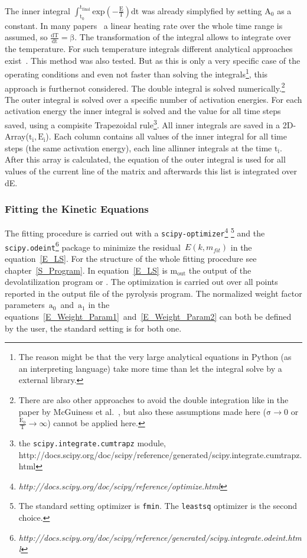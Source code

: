 The inner integral $\mathrm{\int^{t_{final}}_{t_0} exp\left( -\frac{E}{T} \right) dt}$ was already simplyfied by setting $\mathrm{A_0}$ as a constant. In many papers~\cite{Cai_DAEM1,Cai_DAEM2,Cai_DAEM3,Slovak_DAEM} a linear heating rate over the whole time range is assumed, so $\mathrm{\frac{dT}{dt}=\beta}$. The transformation of the integral allows to integrate over the temperature. For such temperature integrals different analytical approaches exist~\cite{Cai_DAEM1,Cai_DAEM2}. This method was also tested. But as this is only a very specific case of the operating conditions and even not faster than solving the integrals\footnote{The reason might be that the very large analytical equations in Python (as an interpreting language) take more time than let the integral solve by a external library.}, this approach is furthernot considered. The double integral is solved numerically.\footnote{There are also other approaches to avoid the double integration like in the paper by McGuiness et al.~\cite{McGuiness_DAEM}, but also these assumptions made here ($\mathrm{\sigma \rightarrow 0 }$ or $\mathrm{\frac{E_0}{T} \rightarrow \infty }$) cannot be applied here.}\\
The outer integral is solved over a specific number of activation energies. For each activation energy the inner integral is solved and the value for all time steps saved, using a compisite Trapezoidal rule\footnote{the \texttt{scipy.integrate.cumtrapz} module, http://docs.scipy.org/doc/scipy/reference/generated/scipy.integrate.cumtrapz.html}. All inner integrals are saved in a 2D-Array($\mathrm{t_i,E_i}$). Each column contains all values of the inner integral for all time steps (the same activation energy), each line allinner integrals at the time $\mathrm{t_i}$. After this array is calculated, the equation of the outer integral is used for all values of the current line of the matrix and afterwards this list is integrated over dE.



\subsubsection{Fitting the Kinetic Equations}\label{SSS_FitKin}
The fitting procedure is carried out with a \texttt{scipy-optimizer}\footnote{\textit{http://docs.scipy.org/doc/scipy/reference/optimize.html}} \footnote{The standard setting optimizer is \texttt{fmin}.  The \texttt{leastsq} optimizer is the second choice.} and the \texttt{scipy.odeint}\footnote{\textit{http://docs.scipy.org/doc/scipy/reference/generated/scipy.integrate.odeint.html}} package to minimize the residual~$E(k,m_{fit})$ in the equation~\ref{E_LS}. For the structure of the whole fitting procedure see chapter~\ref{S_Program}. In equation~\ref{E_LS} is $\mathrm{m_{out}}$ the output of the devolatilization program \CPD or \FGDVC. The optimization is carried out over all points reported in the output file of the pyrolysis program. The normalized weight factor parameters~$\mathrm{a_0}$~and~$\mathrm{a_1}$ in the equations~\ref{E_Weight_Param1}~and~\ref{E_Weight_Param2} can both be defined by the user, the standard setting is for both one.

